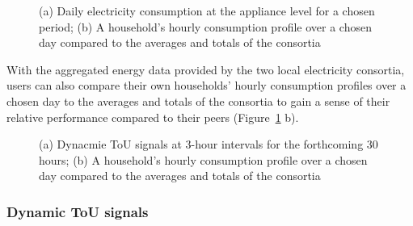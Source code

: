 \begin{figure}
      \begin{center}
        \begin{minipage}[htb]{0.48\linewidth}    
        \end{minipage}
	\hfill 
        \begin{minipage}[htb]{0.49\linewidth}    
        \end{minipage}
      \end{center}
      \caption{(a) Daily electricity consumption at the appliance level for a chosen period;  (b) 
      A household's hourly consumption profile over a chosen day compared to the averages and totals of the consortia
}
\label{fig:viz_hist}
\end{figure}
With the aggregated energy data provided by the two local electricity consortia, users can also  compare their own households' hourly consumption profiles over a chosen day to the averages and totals of the consortia to gain a sense of their relative performance compared to their peers (Figure~\ref{fig:viz_hist} b). 

\begin{figure}
      \begin{center}
        \begin{minipage}[htb]{0.49\linewidth}    
        \end{minipage}
	\hfill 
        \begin{minipage}[htb]{0.49\linewidth}    
        \end{minipage}
      \end{center}
      \caption{(a) Dynacmie ToU signals at 3-hour intervals for the forthcoming 30 hours;  (b) 
      A household's hourly consumption profile over a chosen day compared to the averages and totals of the consortia
}
\label{fig:tou}
\end{figure}

\subsubsection{Dynamic ToU signals} 

